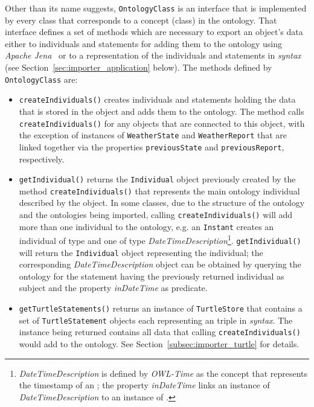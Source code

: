 Other than its name suggests, \texttt{OntologyClass} is an interface that is implemented by every class that corresponds to a concept (class) in the ontology. That interface defines a set of methods which are necessary to export an object's data either to individuals and statements for adding them to the ontology using \emph{Apache Jena}~\cite{apache_jena} or to a representation of the individuals and statements in \emph{ syntax} (see Section~\ref{sec:importer_application} below). The methods defined by \texttt{OntologyClass} are:
\begin{itemize}
  \item \texttt{createIndividuals()} creates individuals and statements holding the data that is stored in the object and adds them to the ontology. The method calls \texttt{createIndividuals()} for any objects that are connected to this object, with the exception of instances of \texttt{Weather\hspace{0pt}State} and \texttt{Weather\hspace{0pt}Report} that are linked together via the properties \texttt{previousState} and \texttt{previousReport}, respectively.
  
  \item \texttt{getIndividual()} returns the \texttt{Individual} object previously created by the method \texttt{createIndividuals()} that represents the main ontology individual described by the object. In some classes, due to the structure of the \smarthomeweather ontology and the ontologies being imported, calling \texttt{createIndividuals()} will add more than one individual to the ontology, e.g. an \texttt{Instant} creates an individual of type  and one of type \emph{DateTimeDescription}\footnote{\emph{DateTimeDescription} is defined by \emph{OWL-Time} as the concept that represents the timestamp of an ; the property \emph{inDateTime} links an instance of \emph{DateTimeDescription} to an instance of .}. \texttt{getIndividual()} will return the \texttt{Individual} object representing the  individual; the corresponding \emph{DateTimeDescription} object can be obtained by querying the ontology for the statement having the previously returned
   individual as subject and the property \emph{inDateTime} as predicate.
  
  \item \texttt{getTurtleStatements()} returns an instance of \texttt{TurtleStore} that contains a set of \texttt{TurtleStatement} objects each representing an  triple in \emph{ syntax}. The instance being returned contains all data that calling \texttt{createIndividuals()} would add to the ontology. See Section~\ref{subsec:importer_turtle} for details.
  

\end{itemize}
